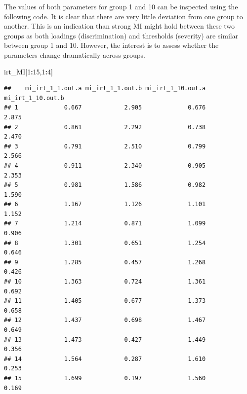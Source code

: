 \documentclass[]{book}
\newenvironment{Shaded}{\begin{snugshade}}{\end{snugshade}}
\newcommand{\CommentTok}[1]{\textcolor[rgb]{0.56,0.35,0.01}{\textit{#1}}}
\newcommand{\DecValTok}[1]{\textcolor[rgb]{0.00,0.00,0.81}{#1}}
\newcommand{\KeywordTok}[1]{\textcolor[rgb]{0.13,0.29,0.53}{\textbf{#1}}}
\newcommand{\NormalTok}[1]{#1}
\newcommand{\OperatorTok}[1]{\textcolor[rgb]{0.81,0.36,0.00}{\textbf{#1}}}
\begin{document}
\begin{Shaded}
\end{Shaded}

The values of both parameters for group 1 and 10 can be inspected using the following code. It is clear that there are very little deviation from one group to another. This is an indication than strong MI might hold between these two groups as both loadings (discrimination) and thresholds (severity) are similar between group 1 and 10. However, the interest is to assess whether the parameters change dramatically across groups.

\begin{Shaded}
\begin{Highlighting}[]
\NormalTok{irt_MI[}\DecValTok{1}\OperatorTok{:}\DecValTok{15}\NormalTok{,}\DecValTok{1}\OperatorTok{:}\DecValTok{4}\NormalTok{]}
\end{Highlighting}
\end{Shaded}

\begin{verbatim}
##    mi_irt_1_1.out.a mi_irt_1_1.out.b mi_irt_1_10.out.a mi_irt_1_10.out.b
## 1             0.667            2.905             0.676             2.875
## 2             0.861            2.292             0.738             2.470
## 3             0.791            2.510             0.799             2.566
## 4             0.911            2.340             0.905             2.353
## 5             0.981            1.586             0.982             1.590
## 6             1.167            1.126             1.101             1.152
## 7             1.214            0.871             1.099             0.906
## 8             1.301            0.651             1.254             0.646
## 9             1.285            0.457             1.268             0.426
## 10            1.363            0.724             1.361             0.692
## 11            1.405            0.677             1.373             0.658
## 12            1.437            0.698             1.467             0.649
## 13            1.473            0.427             1.449             0.356
## 14            1.564            0.287             1.610             0.253
## 15            1.699            0.197             1.560             0.169
\end{verbatim}
\end{document}
